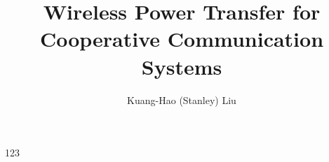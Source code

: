 \documentclass[12pt]{article}%
\begin{document}
\title{Wireless Power Transfer for Cooperative Communication Systems}
\date{}
\author{Kuang-Hao (Stanley) Liu}
\maketitle

123
\end{document}
